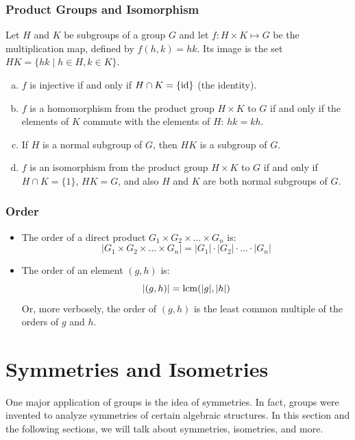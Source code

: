\documentclass[letterpaper]{article}
\begin{document}
\subsubsection{Product Groups and Isomorphism}
\begin{mdframed}
    \begin{proposition}
        Let $H$ and $K$ be subgroups of a group $G$ and let $f: H \times K \mapsto G$ be the multiplication map, defined by $f(h, k) = hk$. Its image is the set $HK = \{hk \mid h \in H, k \in K\}$. 
        \begin{enumerate}[(a)]
            \item $f$ is injective if and only if $H \cap K = \{\operatorname{id}\}$ (the identity). 
            \item $f$ is a homomorphism from the product group $H \times K$ to $G$ if and only if the elements of $K$ commute with the elements of $H$: $hk = kh$. 
            \item If $H$ is a normal subgroup of $G$, then $HK$ is a subgroup of $G$. 
            \item $f$ is an isomorphism from the product group $H \times K$ to $G$ if and only if $H \cap K = \{1\}$, $HK = G$, and also $H$ and $K$ are both normal subgroups of $G$. 
        \end{enumerate}
    \end{proposition}
\end{mdframed}

\subsubsection{Order}
\begin{itemize}
    \item The order of a direct product $G_1 \times G_2 \times \dots \times G_n$ is: 
    \[|G_1 \times G_2 \times \dots \times G_n| = |G_1| \cdot |G_2| \cdot \ldots \cdot |G_n|\]
    \item The order of an element $(g, h)$ is: 
    \[|(g, h)| = \operatorname{lcm}(|g|, |h|)\]
    Or, more verbosely, the order of $(g, h)$ is the least common multiple of the orders of $g$ and $h$. 
\end{itemize}









\newpage 
\section{Symmetries and Isometries}
One major application of groups is the idea of symmetries. In fact, groups were invented to analyze symmetries of certain algebraic structures. In this section and the following sections, we will talk about symmetries, isometries, and more. 
\end{document}
